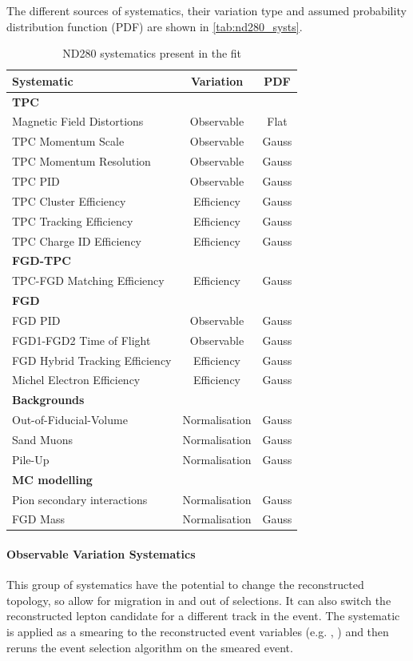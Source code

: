 The different sources of systematics, their variation type and assumed probability distribution function (PDF) are shown in \autoref{tab:nd280_systs}.
\begin{table}[h]
	\begin{tabular}{l | c c}
	\hline
	\hline
	Systematic						& Variation 	& PDF \\
	\hline
	\multicolumn{3}{l}{\textbf{TPC}} \\
	Magnetic Field Distortions		& Observable 	& Flat \\
	TPC Momentum Scale				& Observable	& Gauss \\
	TPC Momentum Resolution			& Observable	& Gauss \\
	TPC PID							& Observable	& Gauss \\
	TPC Cluster Efficiency			& Efficiency	& Gauss \\
	TPC Tracking Efficiency			& Efficiency	& Gauss \\
	TPC Charge ID Efficiency		& Efficiency	& Gauss \\
	\hline 
	\multicolumn{3}{l}{\textbf{FGD-TPC}} \\
	TPC-FGD Matching Efficiency		& Efficiency	& Gauss \\
	\hline
	\multicolumn{3}{l}{\textbf{FGD}} \\
	FGD PID							& Observable	& Gauss \\
	FGD1-FGD2 Time of Flight		& Observable	& Gauss \\
	FGD Hybrid Tracking Efficiency	& Efficiency	& Gauss \\
	Michel Electron Efficiency		& Efficiency	& Gauss \\
	\hline
	\multicolumn{3}{l}{\textbf{Backgrounds}} \\
	Out-of-Fiducial-Volume			& Normalisation & Gauss \\
	Sand Muons						& Normalisation & Gauss \\
	Pile-Up							& Normalisation	& Gauss \\
	\hline
	\multicolumn{3}{l}{\textbf{MC modelling}} \\
	Pion secondary interactions		& Normalisation & Gauss \\
	FGD Mass						& Normalisation & Gauss \\
	\hline
	\hline
	\end{tabular}
\caption{ND280 systematics present in the fit}
\label{tab:nd280_systs}
\end{table}

\paragraph{Observable Variation Systematics}
This group of systematics have the potential to change the reconstructed topology, so allow for migration in and out of selections. It can also switch the reconstructed lepton candidate for a different track in the event. The systematic is applied as a smearing to the reconstructed event variables (e.g. \pmu, \cosmu) and then reruns the event selection algorithm on the smeared event.

